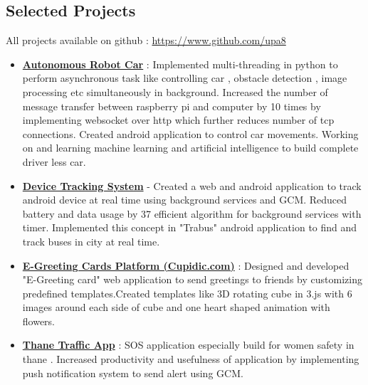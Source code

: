 \documentclass[margin, centered]{res}
\begin{document}
\begin{resume}

\section{Selected Projects}
All projects available on github : \url{https://www.github.com/upa8}
\begin{itemize}[leftmargin=*]
\item \textbf{\href{https://github.com/upa8/Autonomous-Robot-Car}{Autonomous Robot Car}} : Implemented multi-threading in python to perform asynchronous 
task like controlling car , obstacle detection , image processing etc simultaneously in background. 
Increased the number of message transfer between raspberry pi and computer by 10 times by implementing websocket over http which further reduces number of tcp connections.
Created android application to control car movements.
Working on and learning machine learning and artificial intelligence to build complete driver less car.

  \item \textbf{\href{https://github.com/upa8/Device-Tracking-System}{Device Tracking System}} - Created a web and android application to track android device at real 
time using background services and GCM. Reduced battery and data usage by 37%
efficient algorithm for background services with timer. Implemented this concept in "Trabus"
android application to find and track buses in city at real time. 
 \item \textbf{\href{http://cupidic.com/}{E-Greeting Cards Platform (Cupidic.com)}} : 
Designed and developed "E-Greeting card" web application to send greetings to friends by customizing predefined templates.Created templates like 3D rotating cube in 3.js with 6 images around each side of cube and one heart shaped animation with flowers. 
\item \textbf{\href{https://github.com/upa8/Thane-Traffic-App}{Thane Traffic App}} : SOS application especially build for women safety in thane . Increased productivity 
and usefulness of application by implementing push notification system to send alert using GCM.
  
\end{itemize}
 

\end{resume}
\end{document}
